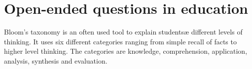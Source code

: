 \section{Open-ended questions in education}
Bloom's taxonomy \cite{bloom1964taxonomy} is an often used tool to explain studentsæ different levels of thinking. It uses six different categories ranging from simple recall of facts to higher level thinking. The categories are knowledge, comprehension, application, analysis, synthesis and evaluation.




